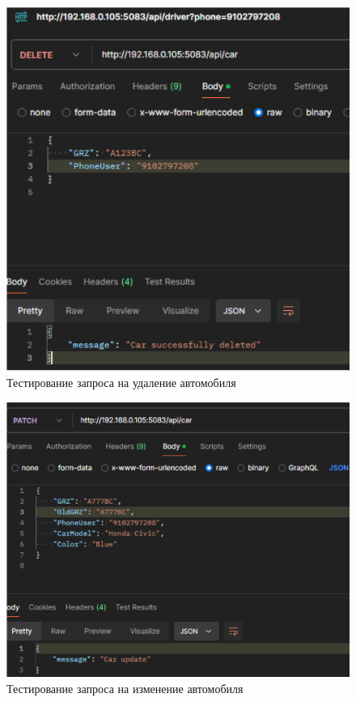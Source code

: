 \begin{figure}[H]
	\centering
	\includegraphics[width=0.7\linewidth]{images/test3}
	\caption{Тестирование запроса на удаление автомобиля}
	\label{fig:test3}
\end{figure}

\begin{figure}[H]
	\centering
	\includegraphics[width=0.7\linewidth]{images/test4}
	\caption{Тестирование запроса на изменение автомобиля}
	\label{fig:test4}
\end{figure}

